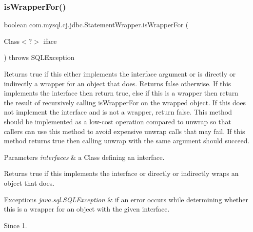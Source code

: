 \mbox{\label{classcom_1_1mysql_1_1cj_1_1jdbc_1_1_statement_wrapper_ac909b23a76074610336931e26f634d2d}} 
\subsubsection{\texorpdfstring{is\+Wrapper\+For()}{isWrapperFor()}}
{\footnotesize\ttfamily boolean com.\+mysql.\+cj.\+jdbc.\+Statement\+Wrapper.\+is\+Wrapper\+For (\begin{DoxyParamCaption}\item[{Class$<$?$>$}]{iface }\end{DoxyParamCaption}) throws S\+Q\+L\+Exception}

Returns true if this either implements the interface argument or is directly or indirectly a wrapper for an object that does. Returns false otherwise. If this implements the interface then return true, else if this is a wrapper then return the result of recursively calling {\ttfamily is\+Wrapper\+For} on the wrapped object. If this does not implement the interface and is not a wrapper, return false. This method should be implemented as a low-\/cost operation compared to {\ttfamily unwrap} so that callers can use this method to avoid expensive {\ttfamily unwrap} calls that may fail. If this method returns true then calling {\ttfamily unwrap} with the same argument should succeed.


\begin{DoxyParams}{Parameters}
{\em interfaces} & a Class defining an interface. \\
\hline
\end{DoxyParams}
\begin{DoxyReturn}{Returns}
true if this implements the interface or directly or indirectly wraps an object that does. 
\end{DoxyReturn}

\begin{DoxyExceptions}{Exceptions}
{\em java.\+sql.\+S\+Q\+L\+Exception} & if an error occurs while determining whether this is a wrapper for an object with the given interface. \\
\hline
\end{DoxyExceptions}
\begin{DoxySince}{Since}
1. 
\end{DoxySince}
\mbox{\label{classcom_1_1mysql_1_1cj_1_1jdbc_1_1_statement_wrapper_aadab86bfdd8ac651097511c9327d3759}} 
